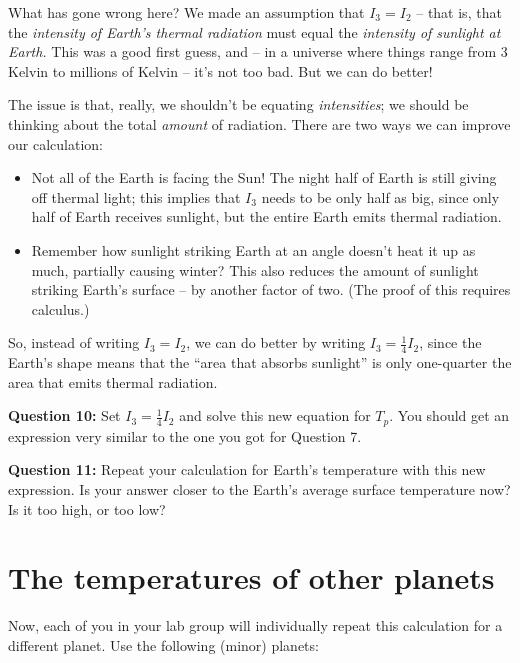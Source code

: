 \documentclass[11pt]{article}
\def\BI{\begin{itemize}}
\def\EI{\end{itemize}}
\begin{document}
\hrulefill
\newpage

What has gone wrong here? We made an assumption that $I_3=I_2$ -- that is, that the {\it intensity of Earth's thermal radiation} must equal the {\it intensity of sunlight at Earth.}
This was a good first guess, and -- in a universe where things range from 3 Kelvin to millions of Kelvin -- it's not too bad. But we can do better!

The issue is that, really, we shouldn't be equating {\it intensities}; we should be thinking about the total {\it amount} of radiation. There are two ways we can improve our calculation:

\BI
\item Not all of the Earth is facing the Sun! The night half of Earth is still giving off thermal light; this implies that $I_3$ needs to be only half as big, since only half of 
Earth receives sunlight, but the entire Earth emits thermal radiation.
\item Remember how sunlight striking Earth at an angle doesn't heat it up as much, partially causing winter? This also reduces the amount of sunlight striking Earth's surface -- by
another factor of two. (The proof of this requires calculus.)
\EI

So, instead of writing $I_3 = I_2$, we can do better by writing $I_3 = \frac{1}{4} I_2$, since the Earth's shape means that the ``area that absorbs sunlight'' is only one-quarter
the area that emits thermal radiation. 

{\bf Question 10:} Set $I_3 = \frac{1}{4}I_2$ and solve this new equation for $T_p$. You should get an expression very similar to the one you got for Question 7.

\vspace*{4cm}

\hrulefill

{\bf Question 11:} Repeat your calculation for Earth's temperature with this new expression. Is your answer closer to the Earth's average surface temperature now? Is it too high, or 
too low?

\vspace*{4cm}

\hrulefill
\newpage


\section*{The temperatures of other planets}

Now, each of you in your lab group will individually repeat this calculation for a different planet. Use the following (minor) planets:
\end{document}
